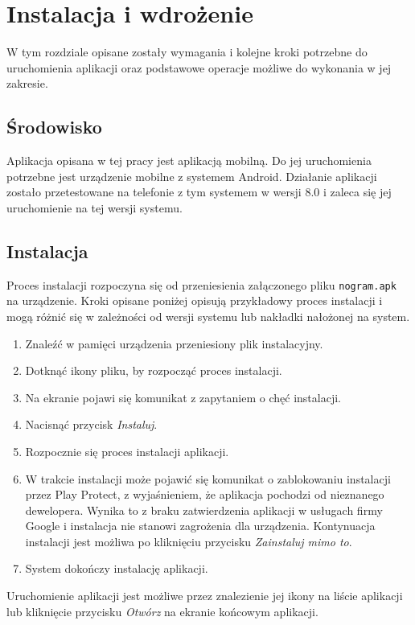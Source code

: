 \chapter{Instalacja i wdrożenie}
\thispagestyle{chapterBeginStyle}

    W tym rozdziale opisane zostały wymagania i kolejne kroki potrzebne do uruchomienia aplikacji
oraz podstawowe operacje możliwe do wykonania w jej zakresie.



\section{Środowisko}
    Aplikacja opisana w tej pracy jest aplikacją mobilną. Do jej uruchomienia potrzebne jest
urządzenie mobilne z systemem Android. Działanie aplikacji zostało przetestowane na telefonie
z tym systemem w wersji 8.0 i zaleca się jej uruchomienie na tej wersji systemu.



\section{Instalacja}
    Proces instalacji rozpoczyna się od przeniesienia załączonego pliku \texttt{nogram.apk} na urządzenie.
Kroki opisane poniżej opisują przykładowy proces instalacji i mogą różnić się w zależności od wersji
systemu lub nakładki nałożonej na system.
\begin{enumerate}
    \item Znaleźć w pamięci urządzenia przeniesiony plik instalacyjny.
    \item Dotknąć ikony pliku, by rozpocząć proces instalacji.
    \item Na ekranie pojawi się komunikat z zapytaniem o chęć instalacji.
    \item Nacisnąć przycisk \textit{Instaluj}.
    \item Rozpocznie się proces instalacji aplikacji.
    \item W trakcie instalacji może pojawić się komunikat o zablokowaniu instalacji przez Play Protect,
z wyjaśnieniem, że aplikacja pochodzi od nieznanego dewelopera. Wynika to z braku zatwierdzenia
aplikacji w usługach firmy Google i instalacja nie stanowi zagrożenia dla urządzenia. Kontynuacja
instalacji jest możliwa po kliknięciu przycisku \textit{Zainstaluj mimo to}.
    \item System dokończy instalację aplikacji.
\end{enumerate}
    Uruchomienie aplikacji jest możliwe przez znalezienie jej ikony na liście aplikacji lub kliknięcie
przycisku \textit{Otwórz} na ekranie końcowym aplikacji.



